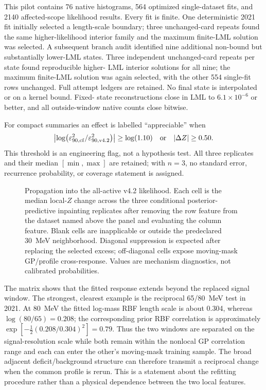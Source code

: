 This pilot contains 76 native histograms, 564 optimized single-dataset fits,
and 2140 affected-scope likelihood results.  Every fit is finite.  One
deterministic 2021 fit initially selected a length-scale boundary; three
unchanged-card repeats found the same higher-likelihood interior family and
the maximum finite-LML solution was selected.  A subsequent branch audit
identified nine additional non-bound but substantially lower-LML states.
Three independent unchanged-card repeats per state found reproducible higher-
LML interior solutions for all nine; the maximum finite-LML solution was again
selected, with the other 554 single-fit rows unchanged.  Full attempt ledgers
are retained.  No final state is interpolated or on a kernel bound.  Fixed-
state reconstructions close in LML to $6.1\times10^{-6}$ or better, and all
outside-window native counts close bitwise.

For compact summaries an effect is labelled ``appreciable'' when
\begin{equation}
  \left|\log\!\left(\varepsilon^2_{90,\mathrm{cf}}/
  \varepsilon^2_{90,\mathrm{v4.2}}\right)\right|\geq\log(1.10)
  \quad\text{or}\quad |\Delta Z|\geq0.50 .
\end{equation}
This threshold is an engineering flag, not a hypothesis test.  All three
replicates and their median $[\min,\max]$ are retained; with $n=3$, no
standard error, recurrence probability, or coverage statement is assigned.

\begin{figure}[H]
\centering
{}
\caption{Propagation into the all-active v4.2 likelihood.  Each cell is the
median local-$Z$ change across the three conditional posterior-predictive
inpainting replicates after removing the row feature from the dataset named
above the panel and evaluating the column feature.  Blank cells are
inapplicable or outside the predeclared 30~MeV neighborhood.  Diagonal
suppression is expected after replacing the selected excess; off-diagonal
cells expose moving-mask GP/profile cross-response.  Values are mechanism diagnostics,
not calibrated probabilities.}
\label{fig:v4p2-candidate-inpainting-matrix}
\end{figure}

The matrix shows that the fitted response extends beyond the replaced signal
window.  The strongest, clearest example is the reciprocal 65/80~MeV test in
2021.  At 80~MeV the fitted log-mass RBF length scale is about 0.304, whereas
$\log(80/65)=0.208$; the corresponding prior RBF correlation is approximately
$\exp[-\tfrac12(0.208/0.304)^2]=0.79$.  Thus the two windows are separated on
the signal-resolution scale while both remain within the nonlocal GP
correlation range and each can enter the other's moving-mask training sample.
The broad adjacent deficit/background structure can therefore transmit a
reciprocal change when the common profile is rerun.  This is a statement about
the refitting procedure rather than a physical dependence between the two
local features.

